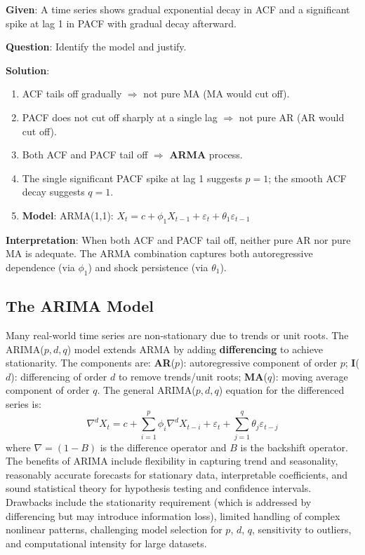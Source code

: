 \documentclass[11pt,a4paper]{article}
\begin{document}
\begin{tcolorbox}[colback=blue!5!white,colframe=blue!75!black,title=\textbf{Worked Example 6: ARMA(1,1) Identification}]
\textbf{Given}: A time series shows gradual exponential decay in ACF and a significant spike at lag 1 in PACF with gradual decay afterward.

\textbf{Question}: Identify the model and justify.

\textbf{Solution}:
\begin{enumerate}
    \item ACF tails off gradually $\Rightarrow$ not pure MA (MA would cut off).
    \item PACF does not cut off sharply at a single lag $\Rightarrow$ not pure AR (AR would cut off).
    \item Both ACF and PACF tail off $\Rightarrow$ \textbf{ARMA} process.
    \item The single significant PACF spike at lag 1 suggests $p = 1$; the smooth ACF decay suggests $q = 1$.
    \item \textbf{Model}: ARMA(1,1): $X_t = c + \phi_1 X_{t-1} + \varepsilon_t + \theta_1 \varepsilon_{t-1}$
\end{enumerate}

\textbf{Interpretation}: When both ACF and PACF tail off, neither pure AR nor pure MA is adequate. The ARMA combination captures both autoregressive dependence (via $\phi_1$) and shock persistence (via $\theta_1$).
\end{tcolorbox}

\subsection{The ARIMA Model}

Many real-world time series are non-stationary due to trends or unit roots. The ARIMA($p, d, q$) model extends ARMA by adding \textbf{differencing} to achieve stationarity. The components are: \textbf{AR}($p$): autoregressive component of order $p$; \textbf{I}($d$): differencing of order $d$ to remove trends/unit roots; \textbf{MA}($q$): moving average component of order $q$. The general ARIMA($p, d, q$) equation for the differenced series is:
\[
\nabla^d X_t = c + \sum_{i=1}^p \phi_i \nabla^d X_{t-i} + \varepsilon_t + \sum_{j=1}^q \theta_j \varepsilon_{t-j}
\]
where $\nabla = (1 - B)$ is the difference operator and $B$ is the backshift operator. The benefits of ARIMA include flexibility in capturing trend and seasonality, reasonably accurate forecasts for stationary data, interpretable coefficients, and sound statistical theory for hypothesis testing and confidence intervals. Drawbacks include the stationarity requirement (which is addressed by differencing but may introduce information loss), limited handling of complex nonlinear patterns, challenging model selection for $p$, $d$, $q$, sensitivity to outliers, and computational intensity for large datasets.
\end{document}
